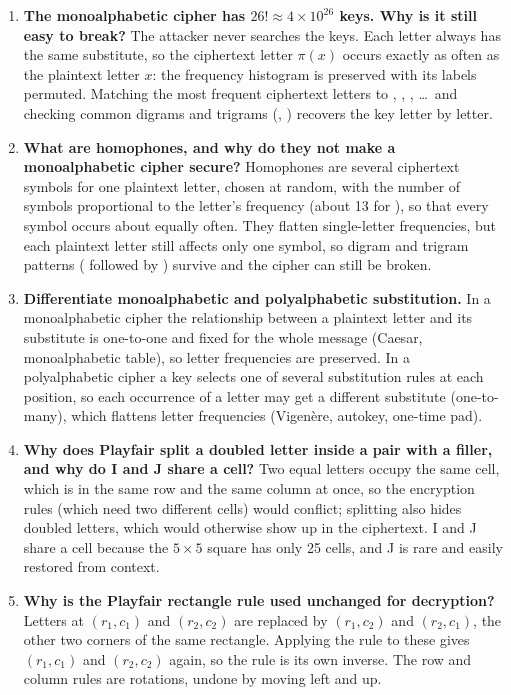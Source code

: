 \begin{enumerate}[leftmargin=1.6em,itemsep=3pt]
  \item \textbf{The monoalphabetic cipher has $26! \approx 4 \times 10^{26}$ keys. Why is it still easy to break?} The attacker never searches the keys. Each letter always has the same substitute, so the ciphertext letter $\pi(x)$ occurs exactly as often as the plaintext letter $x$: the frequency histogram is preserved with its labels permuted. Matching the most frequent ciphertext letters to , , , \dots\ and checking common digrams and trigrams (, ) recovers the key letter by letter.
  \item \textbf{What are homophones, and why do they not make a monoalphabetic cipher secure?} Homophones are several ciphertext symbols for one plaintext letter, chosen at random, with the number of symbols proportional to the letter's frequency (about 13 for ), so that every symbol occurs about equally often. They flatten single-letter frequencies, but each plaintext letter still affects only one symbol, so digram and trigram patterns ( followed by ) survive and the cipher can still be broken.
  \item \textbf{Differentiate monoalphabetic and polyalphabetic substitution.} In a monoalphabetic cipher the relationship between a plaintext letter and its substitute is one-to-one and fixed for the whole message (Caesar, monoalphabetic table), so letter frequencies are preserved. In a polyalphabetic cipher a key selects one of several substitution rules at each position, so each occurrence of a letter may get a different substitute (one-to-many), which flattens letter frequencies (Vigen\`ere, autokey, one-time pad).
  \item \textbf{Why does Playfair split a doubled letter inside a pair with a filler, and why do I and J share a cell?} Two equal letters occupy the same cell, which is in the same row and the same column at once, so the encryption rules (which need two different cells) would conflict; splitting also hides doubled letters, which would otherwise show up in the ciphertext. I and J share a cell because the $5 \times 5$ square has only 25 cells, and J is rare and easily restored from context.
  \item \textbf{Why is the Playfair rectangle rule used unchanged for decryption?} Letters at $(r_1, c_1)$ and $(r_2, c_2)$ are replaced by $(r_1, c_2)$ and $(r_2, c_1)$, the other two corners of the same rectangle. Applying the rule to these gives $(r_1, c_1)$ and $(r_2, c_2)$ again, so the rule is its own inverse. The row and column rules are rotations, undone by moving left and up.

\end{enumerate}
